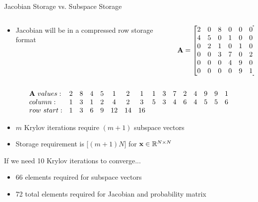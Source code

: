 \documentclass{beamer}
\begin{document}
\begin{frame}{Jacobian Storage vs. Subspace Storage}

  \begin{columns}

    \begin{column}{0.5\textwidth}
      \begin{itemize}
      \item Jacobian will be in a compressed row storage format
      \end{itemize}
    \end{column}

    \begin{column}{0.5\textwidth}
      \small{\[ \mathbf{A} =
        \begin{bmatrix}
          2 & 0 & 8 & 0 & 0 & 0 \\ 4 & 5 & 0 & 1 & 0 & 0 \\ 0 & 2 & 1
          & 0 & 1 & 0 \\ 0 & 0 & 3 & 7 & 0 & 2 \\ 0 & 0 & 0 & 4 & 9 &
          0 \\ 0 & 0 & 0 & 0 & 9 & 1 \\
        \end{bmatrix}      
        \]}
    \end{column}

  \end{columns}

  \pause \small{ \[
    \begin{array}{lccccccccccccccc}
      \mathbf{A}\ values: & 2 & 8 & 4 & 5 & 1 & 2 & 1 & 1 & 3 & 7 & 2 & 4
      & 9 & 9 & 1 \\ column: & 1 & 3 & 1 & 2 & 4 & 2 & 3 & 5 & 3 & 4 &
      6 & 4 & 5 & 5 & 6 \\ row\ start: & 1 & 3 & 6 & 9 & 12 & 14 & 16
      \\
    \end{array}
    \]}

  \pause
  \begin{itemize}
  \item $m$ Krylov iterations require $(m+1)$ subspace vectors
  \item Storage requirement is $\big[(m+1) N\big]$ for $\mathbf{x} \in
    \mathbb{R}^{N \times N}$
  \end{itemize}

  \pause
  \begin{beamerboxesrounded}[upper=boxheadcolor,lower=boxbodycolor,shadow=true]
    {If we need 10 Krylov iterations to converge...}
    \begin{itemize}
    \item 66 elements required for subspace vectors
    \item 72 total elements required for Jacobian and probability
      matrix
    \end{itemize}
  \end{beamerboxesrounded}

\end{frame}
\end{document}
